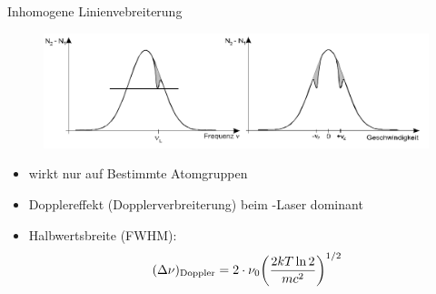 \documentclass[10pt, aspectratio=169]{beamer}
\newcommand{\hne}{\ce{HeNe}}
\begin{document}
\begin{frame}{Inhomogene Linienvebreiterung}
  \begin{figure}
    \includegraphics[width=.7\columnwidth]{inhomogen.png}
  \end{figure}
  \begin{itemize}
  \item wirkt nur auf Bestimmte Atomgruppen
  \item Dopplereffekt (Dopplerverbreiterung) beim \hne{}-Laser
    dominant
  \item Halbwertsbreite (FWHM):
    \begin{equation}
      \label{eq:doppler}
      (\Delta\nu)_{\text{Doppler}}=2\cdot \nu_0\qty(\frac{2kT\ln{2}}{mc^2})^{1/2}
    \end{equation}
  \end{itemize}
\end{frame}
\end{document}
